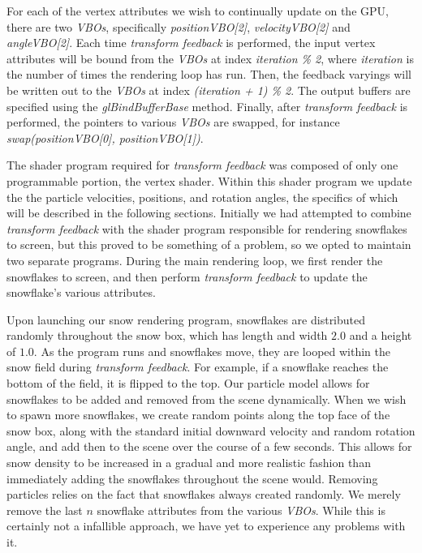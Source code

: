 \documentclass[conference]{acmsiggraph}
\begin{document}
For each of the vertex attributes we wish to continually update on the GPU, there are two \textit{VBOs}, specifically \textit{positionVBO[2]}, \textit{velocityVBO[2]} and \textit{angleVBO[2]}. Each time \textit{transform feedback} is performed, the input vertex attributes will be bound from the \textit{VBOs} at index \textit{iteration \% 2}, where \textit{iteration} is the number of times the rendering loop has run. Then, the feedback varyings will be written out to the \textit{VBOs} at index \textit{(iteration + 1) \% 2}. The output buffers are specified using the \textit{glBindBufferBase} method. Finally, after \textit{transform feedback} is performed, the pointers to various \textit{VBOs} are swapped, for instance \textit{swap(positionVBO[0], positionVBO[1])}.

The shader program required for \textit{transform feedback} was composed of only one programmable portion, the vertex shader. Within this shader program we update the the particle velocities, positions, and rotation angles, the specifics of which will be described in the following sections. Initially we had attempted to combine \textit{transform feedback} with the shader program responsible for rendering snowflakes to screen, but this proved to be something of a problem, so we opted to maintain two separate programs. During the main rendering loop, we first render the snowflakes to screen, and then perform \textit{transform feedback} to update the snowflake's various attributes.

Upon launching our snow rendering program, snowflakes are distributed randomly throughout the snow box, which has length and width $2.0$ and a height of $1.0$. As the program runs and snowflakes move, they are looped within the snow field during \textit{transform feedback}. For example, if a snowflake reaches the bottom of the field, it is flipped to the top. Our particle model allows for snowflakes to be added and removed from the scene dynamically. When we wish to spawn more snowflakes, we create random points along the top face of the snow box, along with the standard initial downward velocity and random rotation angle, and add then to the scene over the course of a few seconds. This allows for snow density to be increased in a gradual and more realistic fashion than immediately adding the snowflakes throughout the scene would. Removing particles relies on the fact that snowflakes always created randomly. We merely remove the last $n$ snowflake attributes from the various \textit{VBOs}. While this is certainly not a infallible approach, we have yet to experience any problems with it.
\end{document}
